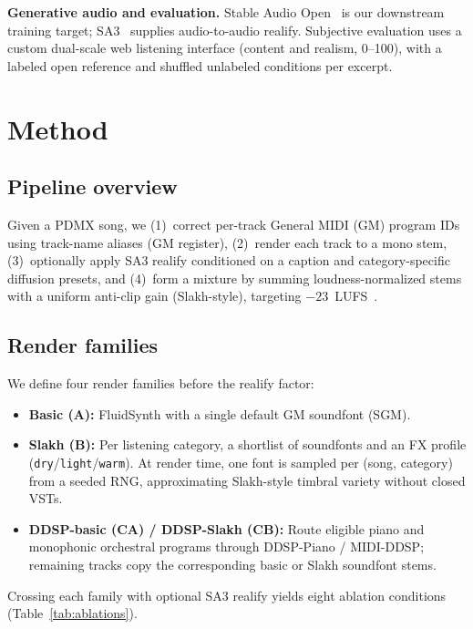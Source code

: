 \documentclass{article}
\begin{document}
\textbf{Generative audio and evaluation.}
Stable Audio Open~\cite{evans2024stable} is our downstream training target; SA3~\cite{evans2026stable} supplies audio-to-audio realify.
Subjective evaluation uses a custom dual-scale web listening interface (content and realism, 0--100), with a labeled open reference and shuffled unlabeled conditions per excerpt.

\section{Method}
\label{sec:method}

\subsection{Pipeline overview}
\label{ssec:pipeline}

Given a PDMX song, we (1)~correct per-track General MIDI (GM) program IDs using track-name aliases (GM register), (2)~render each track to a mono stem, (3)~optionally apply SA3 realify conditioned on a caption and category-specific diffusion presets, and (4)~form a mixture by summing loudness-normalized stems with a uniform anti-clip gain (Slakh-style), targeting $-23$~LUFS~\cite{series2011algorithms}.

\subsection{Render families}
\label{ssec:render}

We define four render families before the realify factor:

\begin{itemize}
\item \textbf{Basic (A):} FluidSynth with a single default GM soundfont (SGM).
\item \textbf{Slakh (B):} Per listening category, a shortlist of soundfonts and an FX profile (\texttt{dry}/\texttt{light}/\texttt{warm}). At render time, one font is sampled per (song, category) from a seeded RNG, approximating Slakh-style timbral variety without closed VSTs.
\item \textbf{DDSP-basic (CA) / DDSP-Slakh (CB):} Route eligible piano and monophonic orchestral programs through DDSP-Piano / MIDI-DDSP; remaining tracks copy the corresponding basic or Slakh soundfont stems.
\end{itemize}

Crossing each family with optional SA3 realify yields eight ablation conditions (Table~\ref{tab:ablations}).
\end{document}
